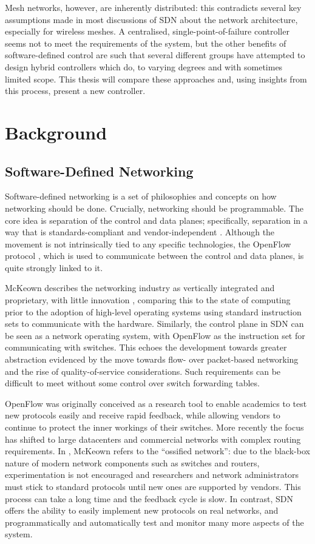 \documentclass[pdftex,12pt,a4paper]{article}
\begin{document}
Mesh networks, however, are inherently distributed: this contradicts several key assumptions made in most discussions of SDN about the network architecture, especially for wireless meshes. A centralised, single-point-of-failure controller seems not to meet the requirements of the system, but the other benefits of software-defined control are such that several different groups have attempted to design hybrid controllers which do, to varying degrees and with sometimes limited scope. This thesis will compare these approaches and, using insights from this process, present a new controller.

\newpage
\section{Background}
\subsection{Software-Defined Networking}
Software-defined networking is a set of philosophies and concepts on how networking should be done. Crucially, networking should be programmable. The core idea is separation of the control and data planes; specifically, separation in a way that is standards-compliant and vendor-independent \cite{onf:sdn}. Although the movement is not intrinsically tied to any specific technologies, the OpenFlow protocol \cite{onf:switch140}, which is used to communicate between the control and data planes, is quite strongly linked to it.

McKeown describes the networking industry as vertically integrated and proprietary, with little innovation \cite{mckeown:sdn}, comparing this to the state of computing prior to the adoption of high-level operating systems using standard instruction sets to communicate with the hardware. Similarly, the control plane in SDN can be seen as a network operating system, with OpenFlow as the instruction set for communicating with switches. This echoes the development towards greater abstraction evidenced by the move towards flow- over packet-based networking and the rise of quality-of-service considerations. Such requirements can be difficult to meet without some control over switch forwarding tables.

OpenFlow was originally conceived \cite{mckeown:openflow} as a research tool to enable academics to test new protocols easily and receive rapid feedback, while allowing vendors to continue to protect the inner workings of their switches. More recently \cite{onf:sdn} the focus has shifted to large datacenters and commercial networks with complex routing requirements. In \cite{mckeown:sdn}, McKeown refers to the  ``ossified network'': due to the black-box nature of modern network components such as switches and routers, experimentation is not encouraged and researchers and network administrators must stick to standard protocols until new ones are supported by vendors. This process can take a long time and the feedback cycle is slow. In contrast, SDN offers the ability to easily implement new protocols on real networks, and programmatically and automatically test and monitor many more aspects of the system.
\end{document}
